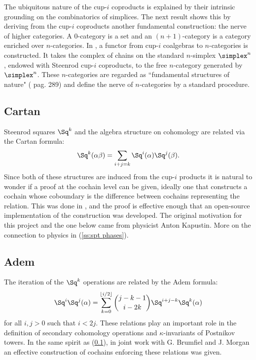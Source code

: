 The ubiquitous nature of the cup-$i$ coproducts is explained by their intrinsic grounding on the combinatorics of simplices.
The next result shows this by deriving from the cup-$i$ coproducts another fundamental construction: the nerve of higher categories.
A $0$-category is a set and an $(n+1)$-category is a category enriched over $n$-categories.
In \cite{medina2020globular}, a functor from cup-$i$ coalgebras to $n$-categories is constructed.
It takes the complex of chains on the standard $n$-simplex $\simplex^n$, endowed with Steenrod cup-$i$ coproducts, to the free $n$-category generated by $\simplex^n$.
These $n$-categories are regarded as ``fundamental structures of nature" (\cite{street1987orientals} pag. 289) and define the nerve of $n$-categories by a standard procedure.

\subsection{Cartan} \label{ss:cartan}

Steenrod squares $\Sq^k$ and the algebra structure on cohomology are related via the Cartan formula:
\begin{equation*}
\Sq^k(\alpha \beta) = \sum_{i+j=k} \Sq^i(\alpha) \Sq^j(\beta).
\end{equation*}
Since both of these structures are induced from the cup-$i$ products it is natural to wonder if a proof at the cochain level can be given, ideally one that constructs a cochain whose coboundary is the difference between cochains representing the relation.
This was done in \cite{medina2020cartan}, and the proof is effective enough that an open-source implementation of the construction was developed.
The original motivation for this project and the one below came from physicist Anton Kapustin.
More on the connection to physics in (\cref{ss:spt phases}).

\subsection{Adem} \label{ss:adem}

The iteration of the $\Sq^k$ operations are related by the Adem formula:
\begin{equation*}
\Sq^i \Sq^j(\alpha) = \sum_{k=0}^{\lfloor i/2 \rfloor} \binom{j-k-1}{i-2k} \Sq^{i+j-k} \Sq^k(\alpha)
\end{equation*}
for all $i,j > 0$ such that $i < 2j$.
These relations play an important role in the definition of secondary cohomology operations and $\kappa$-invariants of Postnikov towers.
In the same spirit as (\cref{ss:cartan}), in joint work with G. Brumfiel and J. Morgan \cite{medina2021adem} an effective construction of cochains enforcing these relations was given.

